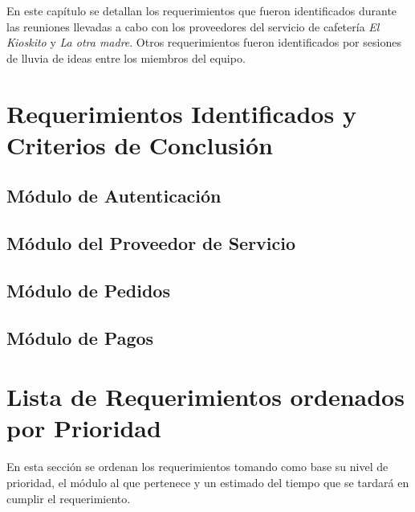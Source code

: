 En este capítulo se detallan los requerimientos que fueron identificados durante las reuniones llevadas a cabo con los proveedores del servicio de cafetería \textit{El Kioskito} y \textit{La otra madre}. Otros requerimientos fueron identificados por sesiones de lluvia de ideas entre los miembros del equipo.

\section{Requerimientos Identificados y Criterios de Conclusión}

\subsection{Módulo de Autenticación}


\subsection{Módulo del Proveedor de Servicio}


\subsection{Módulo de Pedidos}


\subsection{Módulo de Pagos}


\section{Lista de Requerimientos ordenados por Prioridad}

En esta sección se ordenan los requerimientos tomando como base su nivel de prioridad, el módulo al que pertenece y un estimado del tiempo que se tardará en cumplir el requerimiento. 


